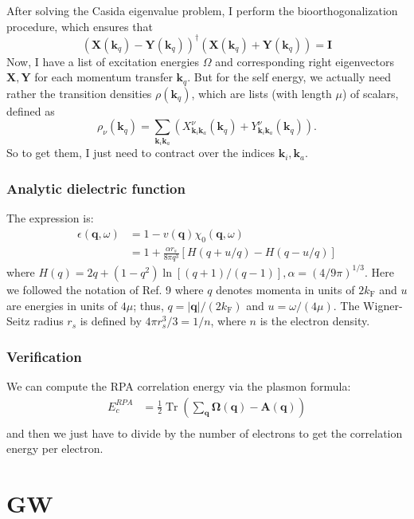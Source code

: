 After solving the Casida eigenvalue problem, I perform the bioorthogonalization procedure, which ensures that
\begin{equation}
    \left(\bm{X}(\bm{k}_q) - \bm{Y}(\bm{k}_q)\right)^\dagger \left(\bm{X}(\bm{k}_q) + \bm{Y}(\bm{k}_q)\right) = \bm{I}
\end{equation}
Now, I have a list of excitation energies $\Omega$ and corresponding right eigenvectors $\bm{X}, \bm{Y}$ for each momentum transfer $\bm{k}_q$. But for the self energy, we actually need rather the transition densities $\rho(\bm{k}_q)$, which are lists (with length $\mu$) of scalars, defined as
\begin{equation}
    \rho_{\nu}(\bm{k}_q) = \sum_{\bm{k}_i \bm{k}_a} \left(X_{\bm{k}_i \bm{k}_a}^\nu(\bm{k}_q) + Y_{\bm{k}_i \bm{k}_a}^\nu(\bm{k}_q)\right).
\end{equation}
So to get them, I just need to contract over the indices $\bm{k}_i, \bm{k}_a$.
\subsubsection{Analytic dielectric function}
The expression is:
\begin{align}
    \epsilon (\mathbf{q}, \omega)&=1 - v(\mathbf{q}) \chi_0(\mathbf{q}, \omega) \\
&= 1+\frac{\alpha r_s}{8 \pi q^3}[H(q+u / q)-H(q-u / q)]
\end{align}
where $H(q)=2 q+\left(1-q^2\right) \ln [(q+1) /(q-1)], \alpha= (4 / 9 \pi)^{1 / 3}$. Here we followed the notation of Ref. 9 where $q$ denotes momenta in units of $2 k_{\mathrm{F}}$ and $u$ are energies in units of $4 \mu$; thus, $q=|\mathbf{q}| /(2 k_{\mathrm{F}})$ and $u=\omega /(4 \mu)$. The Wigner-Seitz radius $r_s$ is defined by $4 \pi r_s^3 / 3=1 / n$, where $n$ is the electron density.
\subsubsection{Verification}
We can compute the RPA correlation energy via the plasmon formula:
\begin{align}
    E_c^{RPA} & = \frac{1}{2} \operatorname{Tr}(\sum_{\bm{q}} \bm{\Omega }(\bm{q}) -\bm{A}(\bm{q})) \\
\end{align}
and then we just have to divide by the number of electrons to get the correlation energy per electron.
\section{GW}

